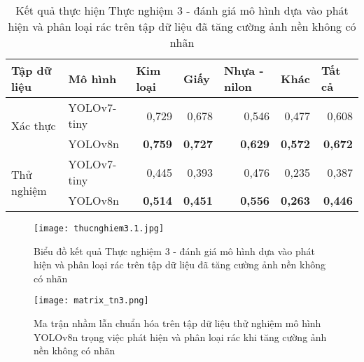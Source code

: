 \documentclass[../the.tex]{subfiles}
\begin{document}
\begin{table}[h!]
    \centering
    \caption{Kết quả thực hiện Thực nghiệm 3 - đánh giá mô hình dựa vào phát hiện và phân loại rác trên tập dữ liệu đã tăng cường ảnh nền không có nhãn}
    \begin{tabular}{|l|l|r|r|r|r|r|}
        \hline
        \multicolumn{1}{|l|}{\textbf{Tập dữ liệu}} & \textbf{Mô hình} & \multicolumn{1}{l|}{\textbf{Kim loại}} & \multicolumn{1}{l|}{\textbf{Giấy}} & \multicolumn{1}{l|}{\textbf{Nhựa - nilon}} & \multicolumn{1}{l|}{\textbf{Khác}} & \multicolumn{1}{l|}{\textbf{Tất cả}} \\ \hline
        \multirow{2}{*}{Xác thực}                  & YOLOv7-tiny      & 0,729                                  & 0,678                              & 0,546                                      & 0,477                              & 0,608                                \\ \cline{2-7} 
                                                   & YOLOv8n          & \textbf{0,759}                         & \textbf{0,727}                     & \textbf{0,629}                             & \textbf{0,572}                     & \textbf{0,672}                       \\ \hline
        \multirow{2}{*}{Thử nghiệm}                & YOLOv7-tiny      & 0,445                                  & 0,393                              & 0,476                                      & 0,235                              & 0,387                                \\ \cline{2-7} 
                                                   & YOLOv8n          & \textbf{0,514}                         & \textbf{0,451}                     & \textbf{0,556}                             & \textbf{0,263}                     & \textbf{0,446}                       \\ \hline
        \end{tabular}
    \label{tab:thucnghiem3.1}
\end{table}

\begin{figure}[H]
    \centering
    \texttt{[image: thucnghiem3.1.jpg]}
    \caption{Biểu đồ kết quả Thực nghiệm 3 - đánh giá mô hình dựa vào phát hiện và phân loại rác trên tập dữ liệu đã tăng cường ảnh nền không có nhãn}
    \label{fig:thucnghiem3}
\end{figure}

\begin{figure}[H]
    \centering
    \texttt{[image: matrix\_tn3.png]}
    \caption{Ma trận nhầm lẫn chuẩn hóa trên tập dữ liệu thử nghiệm mô hình YOLOv8n trọng việc phát hiện và phân loại rác khi tăng cường ảnh nền không có nhãn}
    \label{fig:thucnghiem3.1}
\end{figure}
\end{document}
